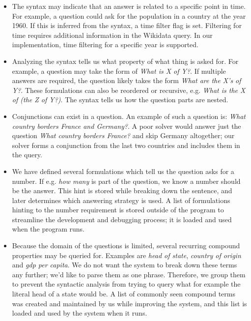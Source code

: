 \documentclass{article}
\begin{document}
\begin{itemize}
    \item The syntax may indicate that an answer is related to a specific point in time. For example, a question could ask for the population in a country at the year 1960. If this is inferred from the syntax, a time filter flag is set. Filtering for time requires additional information in the Wikidata query. In our implementation, time filtering for a specific year is supported.
    \item Analyzing the syntax tells us what property of what thing is asked for. For example, a question may take the form of \emph{What is X of Y?}. If multiple answers are required, the question likely takes the form \emph{What are the X's of Y?}. These formulations can also be reordered or recursive, e.g. \emph{What is the X of (the Z of Y?)}. The syntax tells us how the question parts are nested.
    \item Conjunctions can exist in a question. An example of such a question is: \emph{What country borders France and Germany?}. A poor solver would answer just the question \emph{What country borders France?} and skip Germany altogether; our solver forms a conjunction from the last two countries and includes them in the query.
    \item We have defined several formulations which tell us the question asks for a number. If e.g. \emph{how many} is part of the question, we know a number should be the answer. This hint is stored while breaking down the sentence, and later determines which answering strategy is used. A list of formulations hinting to the number requirement is stored outside of the program to streamline the development and debugging process; it is loaded and used when the program runs.
    \item Because the domain of the questions is limited, several recurring compound properties may be queried for. Examples are \emph{head of state}, \emph{country of origin} and \emph{gdp per capita}. We do not want the system to break down these terms any further; we'd like to parse them as one phrase. Therefore, we group them to prevent the syntactic analysis from trying to query what for example the literal head of a state would be. A list of commonly seen compound terms was created and maintained by us while improving the system, and this list is loaded and used by the system when it runs.
\end{itemize}
\end{document}
